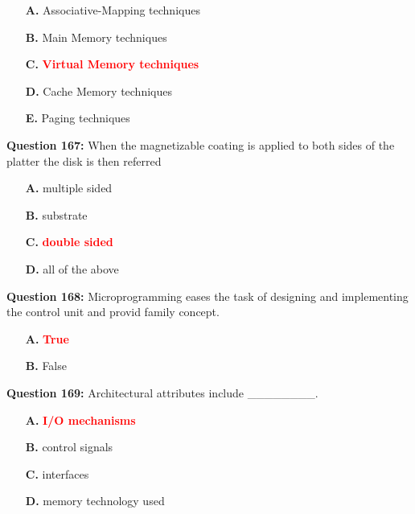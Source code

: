 \documentclass[12pt,a4paper]{article}
\begin{document}
\begin{itemize}
    \item[\textbf{A.}] Associative-Mapping techniques
    \item[\textbf{B.}] Main Memory techniques
    \item[\textbf{C.}] \textcolor{red}{\textbf{Virtual Memory techniques}}
    \item[\textbf{D.}] Cache Memory techniques
    \item[\textbf{E.}] Paging techniques
\end{itemize}

\vspace{0.5cm}

\textbf{Question 167:} When the magnetizable coating is applied to both sides of the platter the disk is then referred

\begin{itemize}
    \item[\textbf{A.}] multiple sided
    \item[\textbf{B.}] substrate
    \item[\textbf{C.}] \textcolor{red}{\textbf{double sided}}
    \item[\textbf{D.}] all of the above
\end{itemize}

\vspace{0.5cm}

\textbf{Question 168:} Microprogramming eases the task of designing and implementing the control unit and provid family concept.

\begin{itemize}
    \item[\textbf{A.}] \textcolor{red}{\textbf{True}}
    \item[\textbf{B.}] False
\end{itemize}

\vspace{0.5cm}

\textbf{Question 169:} Architectural attributes include ________.

\begin{itemize}
    \item[\textbf{A.}] \textcolor{red}{\textbf{I/O mechanisms}}
    \item[\textbf{B.}] control signals
    \item[\textbf{C.}] interfaces
    \item[\textbf{D.}] memory technology used
\end{itemize}
\end{document}
